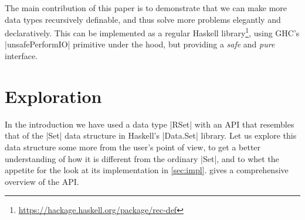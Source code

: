\documentclass[manuscript,screen,acmsmall,nonacm]{acmart}
\begin{document}

The main contribution of this paper is to demonstrate that we can make more data types recursively definable, and thus solve more problems elegantly and declaratively.
This can be implemented as a regular Haskell library\footnote{\url{https://hackage.haskell.org/package/rec-def}}, using GHC's |unsafePerformIO| primitive under the hood, but providing a \emph{safe} and \emph{pure} interface.

\iffalse
The main contributions of this paper are:

\begin{itemize}
\item We demonstrate that by making more data types recursively definable, more problems can be solved elegantly and declaratively. They are \emph{safe}, \emph{pure} and are a natural fit for a language like Haskell.

\item We show how to implement this as a regular library, using GHC's |unsafePerformIO| primitive under the hood.\footnote{The library can be found as \texttt{rec-def} on Hackage; an anonymized copy is included in this submission.}

\item We discuss the difficulties of answering the question whether a language extension like this can still be considered \emph{pure}, contributing questions rather than conclusive answers.

\end{itemize}
\fi

\section{Exploration}\label{sec:exploration}

In the introduction we have used a data type |RSet| with an API that resembles that of the |Set| data structure in Haskell's |Data.Set| library. Let us explore this data structure some more from the user's point of view, to get a better understanding of how it is different from the ordinary |Set|, and to whet the appetite for the look at its implementation in \cref{sec:impl}.
 gives a comprehensive overview of the API.
\end{document}
